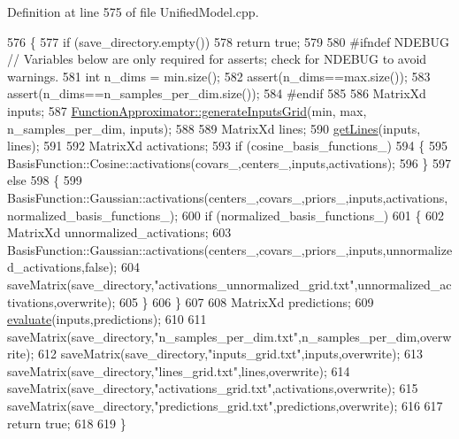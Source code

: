 Definition at line 575 of file Unified\+Model.\+cpp.


\begin{DoxyCode}
576 \{
577   \textcolor{keywordflow}{if} (save\_directory.empty())
578     \textcolor{keywordflow}{return} \textcolor{keyword}{true};  
579  
580 \textcolor{preprocessor}{#ifndef NDEBUG // Variables below are only required for asserts; check for NDEBUG to avoid warnings.}
581   \textcolor{keywordtype}{int} n\_dims = min.size();
582   assert(n\_dims==max.size());
583   assert(n\_dims==n\_samples\_per\_dim.size());
584 \textcolor{preprocessor}{#endif}
585 
586   MatrixXd inputs;
587   \hyperlink{classDmpBbo_1_1FunctionApproximator_a61da4383ffab7d919c98d628c1d217d1}{FunctionApproximator::generateInputsGrid}(min, max, 
      n\_samples\_per\_dim, inputs);
588 
589   MatrixXd lines;
590   \hyperlink{classDmpBbo_1_1UnifiedModel_ae8174f3d5e718d18c587c9bd50dc333f}{getLines}(inputs, lines);
591   
592   MatrixXd activations;
593   \textcolor{keywordflow}{if} (cosine\_basis\_functions\_)
594   \{
595     BasisFunction::Cosine::activations(covars\_,centers\_,inputs,activations);
596   \}
597   \textcolor{keywordflow}{else}
598   \{
599     BasisFunction::Gaussian::activations(centers\_,covars\_,priors\_,inputs,activations,
      normalized\_basis\_functions\_);
600     \textcolor{keywordflow}{if} (normalized\_basis\_functions\_)
601     \{
602       MatrixXd unnormalized\_activations;
603       BasisFunction::Gaussian::activations(centers\_,covars\_,priors\_,inputs,unnormalized\_activations,\textcolor{keyword}{false});
604       saveMatrix(save\_directory,\textcolor{stringliteral}{"activations\_unnormalized\_grid.txt"},unnormalized\_activations,overwrite);
605     \}
606   \}
607     
608   MatrixXd predictions;
609   \hyperlink{classDmpBbo_1_1UnifiedModel_a7f75b15a5b46d4efa1974290cab4b901}{evaluate}(inputs,predictions);
610   
611   saveMatrix(save\_directory,\textcolor{stringliteral}{"n\_samples\_per\_dim.txt"},n\_samples\_per\_dim,overwrite);
612   saveMatrix(save\_directory,\textcolor{stringliteral}{"inputs\_grid.txt"},inputs,overwrite);
613   saveMatrix(save\_directory,\textcolor{stringliteral}{"lines\_grid.txt"},lines,overwrite);
614   saveMatrix(save\_directory,\textcolor{stringliteral}{"activations\_grid.txt"},activations,overwrite);
615   saveMatrix(save\_directory,\textcolor{stringliteral}{"predictions\_grid.txt"},predictions,overwrite);
616   
617   \textcolor{keywordflow}{return} \textcolor{keyword}{true};
618   
619 \}
\end{DoxyCode}


